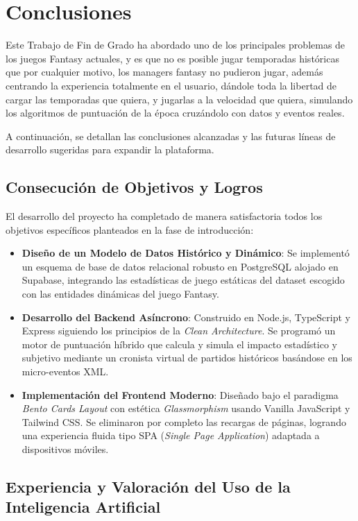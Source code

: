 \chapter{Conclusiones}
\label{chap:conclusiones}

Este Trabajo de Fin de Grado ha abordado uno de los principales problemas de los juegos Fantasy actuales, y es que no es posible jugar temporadas históricas que por cualquier motivo, los managers fantasy no pudieron jugar, además centrando la experiencia totalmente en el usuario, dándole toda la libertad de cargar las temporadas que quiera, y jugarlas a la velocidad que quiera, simulando los algoritmos de puntuación de la época cruzándolo con datos y eventos reales. 

A continuación, se detallan las conclusiones alcanzadas y las futuras líneas de desarrollo sugeridas para expandir la plataforma.

\section{Consecución de Objetivos y Logros}
El desarrollo del proyecto ha completado de manera satisfactoria todos los objetivos específicos planteados en la fase de introducción:
\begin{itemize}
    \item \textbf{Diseño de un Modelo de Datos Histórico y Dinámico}: Se implementó un esquema de base de datos relacional robusto en PostgreSQL alojado en Supabase, integrando las estadísticas de juego estáticas del dataset escogido con las entidades dinámicas del juego Fantasy.
    \item \textbf{Desarrollo del Backend Asíncrono}: Construido en Node.js, TypeScript y Express siguiendo los principios de la \textit{Clean Architecture}. Se programó un motor de puntuación híbrido que calcula y simula el impacto estadístico y subjetivo mediante un cronista virtual de partidos históricos basándose en los micro-eventos XML.
    \item \textbf{Implementación del Frontend Moderno}: Diseñado bajo el paradigma \textit{Bento Cards Layout} con estética \textit{Glassmorphism} usando Vanilla JavaScript y Tailwind CSS. Se eliminaron por completo las recargas de páginas, logrando una experiencia fluida tipo SPA (\textit{Single Page Application}) adaptada a dispositivos móviles.
\end{itemize}

\section{Experiencia y Valoración del Uso de la Inteligencia Artificial}
\label{sec:valoracion_ia}

